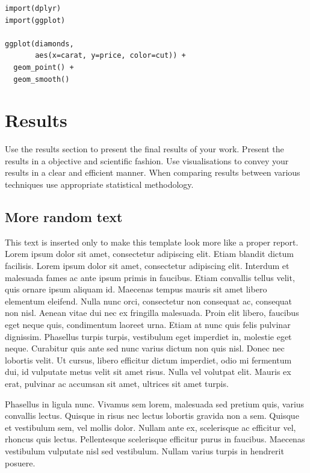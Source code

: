 \documentclass[fleqn,moreauthors,10pt]{ds_report}
\begin{document}
\lstset{language=Python}


\lstset{language=R}
\begin{lstlisting}
import(dplyr)
import(ggplot)

ggplot(diamonds,
	   aes(x=carat, y=price, color=cut)) +
  geom_point() +
  geom_smooth()
\end{lstlisting}


\section*{Results}

Use the results section to present the final results of your work. Present the results in a objective and scientific fashion. Use visualisations to convey your results in a clear and efficient manner. When comparing results between various techniques use appropriate statistical methodology.

\subsection*{More random text}

This text is inserted only to make this template look more like a proper report. Lorem ipsum dolor sit amet, consectetur adipiscing elit. Etiam blandit dictum facilisis. Lorem ipsum dolor sit amet, consectetur adipiscing elit. Interdum et malesuada fames ac ante ipsum primis in faucibus. Etiam convallis tellus velit, quis ornare ipsum aliquam id. Maecenas tempus mauris sit amet libero elementum eleifend. Nulla nunc orci, consectetur non consequat ac, consequat non nisl. Aenean vitae dui nec ex fringilla malesuada. Proin elit libero, faucibus eget neque quis, condimentum laoreet urna. Etiam at nunc quis felis pulvinar dignissim. Phasellus turpis turpis, vestibulum eget imperdiet in, molestie eget neque. Curabitur quis ante sed nunc varius dictum non quis nisl. Donec nec lobortis velit. Ut cursus, libero efficitur dictum imperdiet, odio mi fermentum dui, id vulputate metus velit sit amet risus. Nulla vel volutpat elit. Mauris ex erat, pulvinar ac accumsan sit amet, ultrices sit amet turpis.

Phasellus in ligula nunc. Vivamus sem lorem, malesuada sed pretium quis, varius convallis lectus. Quisque in risus nec lectus lobortis gravida non a sem. Quisque et vestibulum sem, vel mollis dolor. Nullam ante ex, scelerisque ac efficitur vel, rhoncus quis lectus. Pellentesque scelerisque efficitur purus in faucibus. Maecenas vestibulum vulputate nisl sed vestibulum. Nullam varius turpis in hendrerit posuere.
\end{document}
